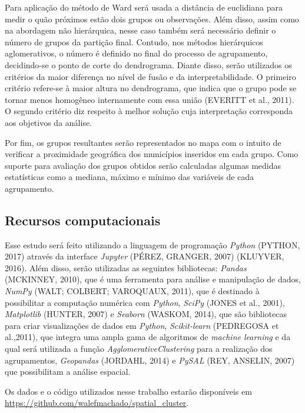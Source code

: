 \documentclass[12pt, a4paper,brazil,oneside]{article}
\begin{document}
	Para aplicação do método de Ward será usada a distância de euclidiana para medir o quão próximos estão dois grupos ou observações. Além disso, assim como na abordagem não hierárquica, nesse caso também será necessário definir o número de grupos da partição final. Contudo, nos métodos hierárquicos aglomerativos, o número é definido no final do processo de agrupamento, decidindo-se o ponto de corte do dendrograma. Diante disso, serão utilizados os critérios da maior diferença no nível de fusão e da interpretabilidade. O primeiro critério refere-se à maior altura no dendrograma, que indica que o grupo pode se tornar menos homogêneo internamente com essa união (EVERITT et al., 2011). O segundo critério diz respeito à melhor solução cuja interpretação corresponda aos objetivos da análise. 
	
	Por fim, os grupos resultantes serão representados no mapa com o intuito de verificar a proximidade geográfica dos  municípios inseridos em cada grupo. Como suporte para avaliação dos grupos obtidos serão calculadas algumas medidas estatísticas como a mediana, máximo e mínimo das variáveis de cada agrupamento. 
	
	
	\subsection{Recursos computacionais}
	Esse estudo será feito utilizando a linguagem de programação \textit{Python} (PYTHON, 2017) através da interface \textit{Jupyter} (PÉREZ, GRANGER, 2007) (KLUYVER, 2016).
	Além disso, serão utilizadas as seguintes bibliotecas: 
	\textit{Pandas} (MCKINNEY, 2010), que é uma ferramenta  para análise e manipulação de dados,
	\textit{NumPy} (WALT; COLBERT; VAROQUAUX, 2011), que é destinado à possibilitar a computação numérica com \textit{Python},
	\textit{SciPy} (JONES et al., 2001),
	\textit{Matplotlib} (HUNTER, 2007) e \textit{Seaborn} (WASKOM, 2014), que são bibliotecas para criar visualizações  de dados em \textit{Python},
	\textit{Scikit-learn} (PEDREGOSA et al.,2011), que integra uma ampla gama de algoritmos de \textit{machine learning} e da qual será utilizada a função \textit{AgglomerativeClustering} para a realização dos agrupamentos,
	\textit{Geopandas} (JORDAHL, 2014) e \textit{PySAL} (REY, ANSELIN, 2007) que possibilitam a análise espacial.
	
	
	Os dados e o código utilizados nesse trabalho estarão disponíveis em \url{https://github.com/walefmachado/spatial_cluster}. 
	
	
\end{document}
